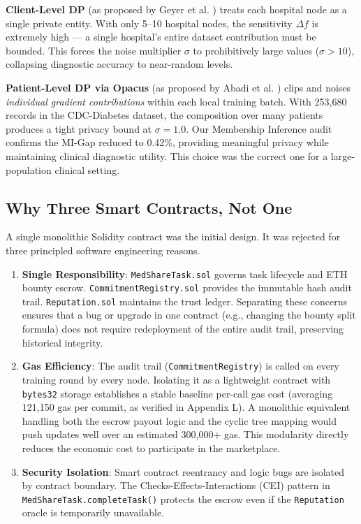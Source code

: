 \documentclass[10pt, a4paper, twocolumn]{article}
\begin{document}
\textbf{Client-Level DP} (as proposed by Geyer et al. \cite{geyer2017}) treats each hospital node as a single private entity. With only 5--10 hospital nodes, the sensitivity $\Delta f$ is extremely high --- a single hospital's entire dataset contribution must be bounded. This forces the noise multiplier $\sigma$ to prohibitively large values ($\sigma > 10$), collapsing diagnostic accuracy to near-random levels.

\textbf{Patient-Level DP via Opacus} (as proposed by Abadi et al. \cite{abadi2016}) clips and noises \textit{individual gradient contributions} within each local training batch. With 253,680 records in the CDC-Diabetes dataset, the composition over many patients produces a tight privacy bound at $\sigma = 1.0$. Our Membership Inference audit confirms the MI-Gap reduced to 0.42\%, providing meaningful privacy while maintaining clinical diagnostic utility. This choice was the correct one for a large-population clinical setting.

\subsection{Why Three Smart Contracts, Not One}
A single monolithic Solidity contract was the initial design. It was rejected for three principled software engineering reasons.

\begin{enumerate}
    \item \textbf{Single Responsibility}: \texttt{MedShareTask.sol} governs task lifecycle and ETH bounty escrow. \texttt{CommitmentRegistry.sol} provides the immutable hash audit trail. \texttt{Reputation.sol} maintains the trust ledger. Separating these concerns ensures that a bug or upgrade in one contract (e.g., changing the bounty split formula) does not require redeployment of the entire audit trail, preserving historical integrity.
    \item \textbf{Gas Efficiency}: The audit trail (\texttt{CommitmentRegistry}) is called on every training round by every node. Isolating it as a lightweight contract with \texttt{bytes32} storage establishes a stable baseline per-call gas cost (averaging 121,150 gas per commit, as verified in Appendix L). A monolithic equivalent handling both the escrow payout logic and the cyclic tree mapping would push updates well over an estimated 300,000+ gas. This modularity directly reduces the economic cost to participate in the marketplace.
    \item \textbf{Security Isolation}: Smart contract reentrancy and logic bugs are isolated by contract boundary. The Checks-Effects-Interactions (CEI) pattern in \texttt{MedShareTask.completeTask()} protects the escrow even if the \texttt{Reputation} oracle is temporarily unavailable.
\end{enumerate}
\end{document}
